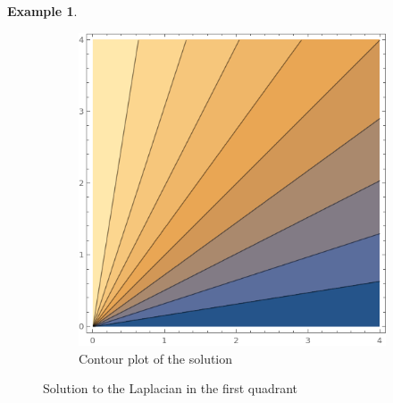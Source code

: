 \documentclass[a4paper, 12pt]{article}
\theoremstyle{definition}
\newtheorem{example}{Example}
\numberwithin{theorem}{section}
\numberwithin{definition}{section}
\numberwithin{exercise}{section}
\numberwithin{remark}{section}
\numberwithin{figure}{section}
\numberwithin{example}{section}
\begin{document}
\begin{example}
\begin{figure}[tbp]
\begin{subfigure}[b]{0.5\textwidth}
            \centering
            \includegraphics[width=\textwidth]{FanLaplacian2}
            \caption{Contour plot of the solution}
        \end{subfigure}
        \caption{Solution to the Laplacian in the first quadrant}
        \label{fig: Laplacian First Quadrant}
    \end{figure}

\end{example}
\end{document}
